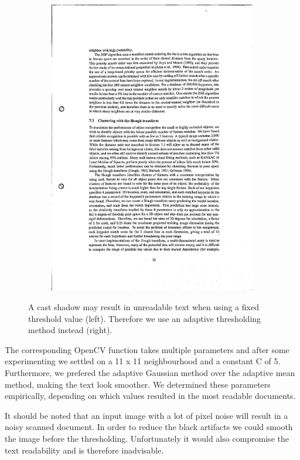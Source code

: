 \documentclass[bibliography=totoc]{scrartcl}
\begin{document}
\begin{figure}[h!]
\begin{subfigure}[b]{0.3\linewidth}
			\includegraphics[width=\linewidth]{imgs/threshold/bad_lighting_adaptive.jpg}
		\end{subfigure}
		\caption{A cast shadow may result in unreadable text when using a fixed threshold value (left). Therefore we use an adaptive thresholding method instead (right).}
		\label{fig:thresholding}
	\end{figure}


	The corresponding OpenCV function takes multiple parameters and after some experimenting we settled on a 11 x 11 neighbourhood and a constant C of 5. 
	Furthermore, we prefered the adaptive Gaussian method over the adaptive mean method, making the text look smoother.
	We determined these parameters empirically, depending on which values resulted in the most readable documents.

	It should be noted that an input image with a lot of pixel noise will result in a noisy scanned document.
	In order to reduce the black artifacts we could smooth the image before the thresholding. 
	Unfortunately it would also compromise the text readability and is therefore inadvisable. 
\end{document}
